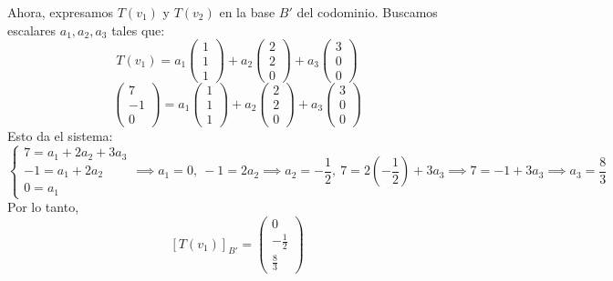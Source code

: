 \begin{prob}
\begin{myproof}
Ahora, expresamos $T(v_1)$ y $T(v_2)$ en la base $B'$ del codominio. Buscamos escalares $a_1, a_2, a_3$ tales que:
\[
T(v_1) = a_1 \begin{pmatrix} 1 \\ 1 \\ 1 \end{pmatrix} + a_2 \begin{pmatrix} 2 \\ 2 \\ 0 \end{pmatrix} + a_3 \begin{pmatrix} 3 \\ 0 \\ 0 \end{pmatrix}
\]
\[
\begin{pmatrix} 7 \\ -1 \\ 0 \end{pmatrix} = a_1 \begin{pmatrix} 1 \\ 1 \\ 1 \end{pmatrix} + a_2 \begin{pmatrix} 2 \\ 2 \\ 0 \end{pmatrix} + a_3 \begin{pmatrix} 3 \\ 0 \\ 0 \end{pmatrix}
\]
Esto da el sistema:
\[
\begin{cases}
7 = a_1 + 2a_2 + 3a_3 \\
-1 = a_1 + 2a_2 \\
0 = a_1
\end{cases}
\implies a_1 = 0,\ -1 = 2a_2 \implies a_2 = -\frac{1}{2},\ 7 = 2(-\frac{1}{2}) + 3a_3 \implies 7 = -1 + 3a_3 \implies a_3 = \frac{8}{3}
\]
Por lo tanto,
\[
[T(v_1)]_{B'} = \begin{pmatrix} 0 \\ -\frac{1}{2} \\ \frac{8}{3} \end{pmatrix}
\]


\end{myproof}
\end{prob}
